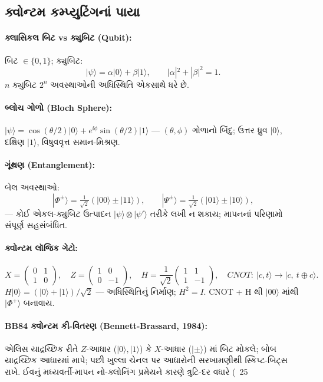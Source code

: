 \subsection{ક્વોન્ટમ કમ્પ્યુટિંગનાં પાયા }
\paragraph{ક્લાસિકલ બિટ vs ક્યુબિટ (Qubit):} બિટ $\in\{0,1\}$; ક્યુબિટ:
\begin{equation}
|\psi\rangle=\alpha|0\rangle+\beta|1\rangle,\qquad |\alpha|^{2}+|\beta|^{2}=1 .
\label{eq:qubit}
\end{equation}
$n$ ક્યુબિટ $2^{n}$ અવસ્થાઓની અધિસ્થિતિ એકસાથે ધરે છે.
\paragraph{બ્લોચ ગોળો (Bloch Sphere):} $|\psi\rangle=\cos(\theta/2)|0\rangle+e^{\ii\phi}\sin(\theta/2)|1\rangle$ — $(\theta,\phi)$ ગોળાનો બિંદુ; ઉત્તર ધ્રુવ $|0\rangle$, દક્ષિણ $|1\rangle$, વિષુવવૃત્ત સમાન-મિશ્રણ.
\paragraph{ગૂંથણ (Entanglement):} બેલ અવસ્થાઓ:
\[
|\Phi^{\pm}\rangle=\tfrac{1}{\sqrt2}(|00\rangle\pm|11\rangle),\qquad
|\Psi^{\pm}\rangle=\tfrac{1}{\sqrt2}(|01\rangle\pm|10\rangle),
\]
— કોઈ એકલ-ક્યુબિટ ઉત્પાદન $|\psi\rangle\otimes|\psi'\rangle$ તરીકે લખી ન શકાય; માપનનાં પરિણામો સંપૂર્ણ સહસંબંધિત.
\paragraph{ક્વોન્ટમ લૉજિક ગેટો:}
\[
X=\begin{pmatrix}0&1\\1&0\end{pmatrix},\quad
Z=\begin{pmatrix}1&0\\0&-1\end{pmatrix},\quad
H=\frac{1}{\sqrt2}\begin{pmatrix}1&1\\1&-1\end{pmatrix},\quad
CNOT:\ |c,t\rangle\to|c,\ t\oplus c\rangle .
\]
$H|0\rangle=(|0\rangle+|1\rangle)/\sqrt2$ — અધિસ્થિતિનું નિર્માણ; $H^2=I$. CNOT + H થી $|00\rangle$ માંથી $|\Phi^+\rangle$ બનાવાય.
\paragraph{BB84 ક્વોન્ટમ કી-વિતરણ (Bennett-Brassard, 1984):}
એલિસ યાદ્રચ્છિક રીતે $Z$-આધાર ($|0\rangle,|1\rangle$) કે $X$-આધાર ($|\pm\rangle$) માં બિટ મોકલે; બોબ યાદ્રચ્છિક આધારમાં માપે; પછી ખુલ્લા ચેનલ પર આધારોની સરખામણીથી સ્કિપ્ટ-બિટ્સ રાખે. ઈવનું મધ્યવર્તી-માપન નો-ક્લોનિંગ પ્રમેયને કારણે ત્રુટિ-દર વધારે (~25%

